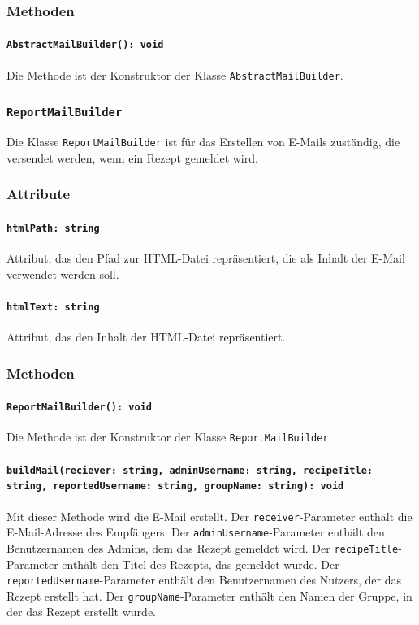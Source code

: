 \documentclass{entwurfsheft}
\begin{document}
\subsubsection*{Methoden}
\paragraph{\texttt{AbstractMailBuilder(): void}}
Die Methode ist der Konstruktor der Klasse \texttt{AbstractMailBuilder}.

\subsubsection{\texttt{ReportMailBuilder}}\label{sec:ReportMailBuilder}
Die Klasse \texttt{ReportMailBuilder} ist für das Erstellen von E-Mails zuständig, die versendet werden, wenn ein Rezept gemeldet wird.
\subsubsection*{Attribute}
\paragraph{\texttt{htmlPath: string}}
Attribut, das den Pfad zur HTML-Datei repräsentiert, die als Inhalt der E-Mail verwendet werden soll.
\paragraph{\texttt{htmlText: string}}
Attribut, das den Inhalt der HTML-Datei repräsentiert.
\subsubsection*{Methoden}
\paragraph{\texttt{ReportMailBuilder(): void}}
Die Methode ist der Konstruktor der Klasse \texttt{ReportMailBuilder}.
\paragraph{\texttt{buildMail(reciever: string, adminUsername: string, recipeTitle: string, reportedUsername: string, groupName: string): void}}
Mit dieser Methode wird die E-Mail erstellt. Der \texttt{receiver}-Parameter enthält die E-Mail-Adresse des Empfängers. Der \texttt{adminUsername}-Parameter enthält den Benutzernamen des Admins, dem das Rezept gemeldet wird. Der \texttt{recipeTitle}-Parameter enthält den Titel des Rezepts, das gemeldet wurde. Der \texttt{reportedUsername}-Parameter enthält den Benutzernamen des Nutzers, der das Rezept erstellt hat. Der \texttt{groupName}-Parameter enthält den Namen der Gruppe, in der das Rezept erstellt wurde.
\end{document}

